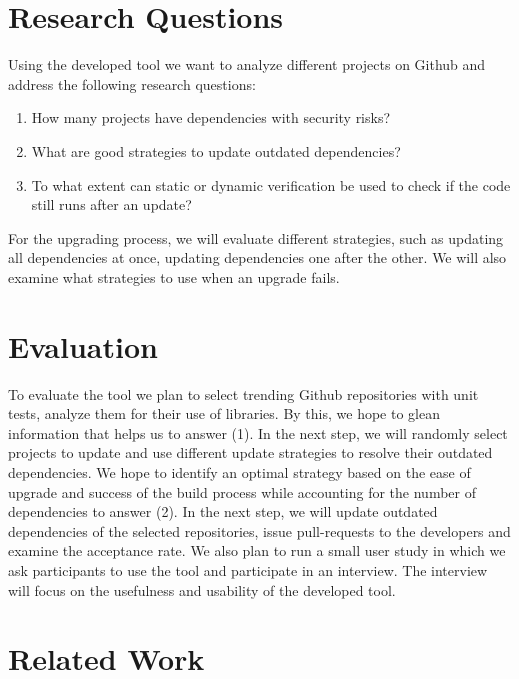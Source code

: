 \documentclass[sigconf]{acmart}
\begin{document}
\section{Research Questions}

Using the developed tool we want to analyze different projects on Github and address the following research questions:

\begin{enumerate}
\item How many projects have dependencies with security risks?
\item What are good strategies to update outdated dependencies?
\item To what extent can static or dynamic verification be used to check if the code still runs after an update?
\end{enumerate}

For the upgrading process, we will evaluate different strategies, such as updating all dependencies at once, updating dependencies one after the other. We will also examine what strategies to use when an upgrade fails.

\section{Evaluation}


To evaluate the tool we plan to select trending Github repositories with unit tests, analyze them for their use of libraries. By this, we hope to glean information that helps us to answer (1). In the next step, we will randomly select projects to update and use different update strategies to resolve their outdated dependencies. We hope to identify an optimal strategy based on the ease of upgrade and success of the build process while accounting for the number of dependencies to answer (2). In the next step, we will update outdated dependencies of the selected repositories, issue pull-requests to the developers and examine the acceptance rate. We also plan to run a small user study in which we ask participants to use the tool and participate in an interview. The interview will focus on the usefulness and usability of the developed tool.

\section{Related Work}
\end{document}
